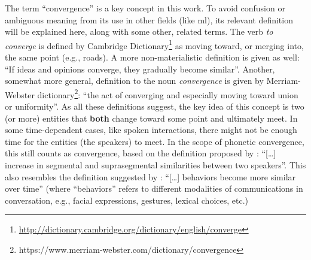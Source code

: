 The term \enquote{convergence} is a key concept in this work.
To avoid confusion or ambiguous meaning from its use in other fields (like \ac{ml}), its relevant definition will be explained here, along with some other, related terms.
The verb \textit{to converge} is defined by Cambridge Dictionary\footnote{\url{http://dictionary.cambridge.org/dictionary/english/converge}} as moving toward, or merging into, the same point (e.g., roads).
A more non-materialistic definition is given as well: \enquote{If ideas and opinions converge, they gradually become similar}.
Another, somewhat more general, definition to the noun \textit{convergence} is given by Merriam-Webster dictionary\footnote{https://www.merriam-webster.com/dictionary/convergence}: \enquote{the act of converging and especially moving toward union or uniformity}.
As all these definitions suggest, the key idea of this concept is two (or more) entities that \textbf{both} change toward some point and ultimately meet.
In some time-dependent cases, like spoken interactions, there might not be enough time for the entities (the speakers) to meet.
In the scope of phonetic convergence, this still counts as convergence, based on the definition proposed by \citet{Pardo2006phonetic}: \enquote{[\ldots] increase in segmental and suprasegmental similarities between two speakers}.
This also resembles the definition suggested by \citet{Xia2014prosodic}: \enquote{[\ldots] behaviors become more similar over time} (where \enquote{behaviors} refers to different modalities of communications in conversation, e.g., facial expressions, gestures, lexical choices, etc.)

